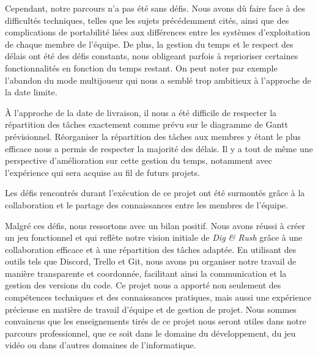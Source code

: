 \documentclass[a4paper,12pt]{article}
\begin{document}
Cependant, notre parcours n’a pas été sans défis. Nous avons dû faire face à des diﬀicultés techniques, telles que les sujets précédemment cités, ainsi que des complications de portabilité liées aux différences entre les systèmes d’exploitation de chaque membre de l’équipe. De plus, la gestion du temps et le respect des délais ont été des défis constants, nous obligeant parfois à reprioriser certaines fonctionnalités en fonction du temps restant. 
On peut noter par exemple l’abandon du mode multijoueur qui nous a semblé trop ambitieux à l’approche de la date limite. 

À l’approche de la date de livraison, il nous a été diﬀicile de respecter la répartition des tâches exactement comme prévu sur le diagramme de Gantt prévisionnel.
Réorganiser la répartition des tâches aux membres y étant le plus efficace nous a permis de respecter la majorité des délais.
Il y a tout de même une perspective d’amélioration sur cette gestion du temps, notamment avec l’expérience qui sera acquise au fil de futurs projets.

Les défis rencontrés durant l’exécution de ce projet ont été surmontés grâce à la collaboration et le partage des connaissances entre les membres de l’équipe.

Malgré ces défis, nous ressortons avec un bilan positif. 
Nous avons réussi à créer un jeu fonctionnel et qui reflète notre vision initiale de \textit{Dig \& Rush} grâce à une collaboration efficace et à une répartition des tâches adaptée. 
En utilisant des outils tels que Discord, Trello et Git, nous avons pu organiser notre travail de manière transparente et coordonnée, facilitant ainsi la communication et la gestion des versions du code.
Ce projet nous a apporté non seulement des compétences techniques et des connaissances pratiques, mais aussi une expérience précieuse en matière de travail d’équipe et de gestion de projet. 
Nous sommes convaincus que les enseignements tirés de ce projet nous seront utiles dans notre parcours professionnel, que ce soit dans le domaine du développement, du jeu vidéo ou dans d’autres domaines de l’informatique.
\end{document}
